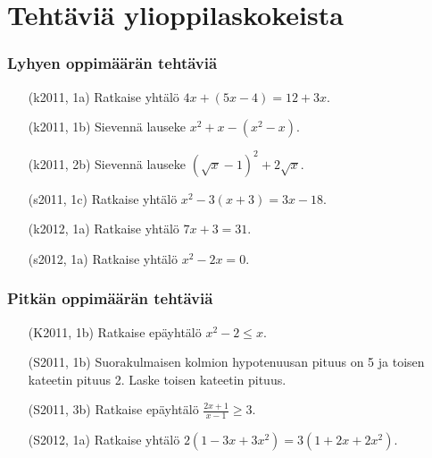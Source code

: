\chapter{Tehtäviä ylioppilaskokeista}

\subsection*{Lyhyen oppimäärän tehtäviä}

\begin{itemize}
  \item[(k2011, 1a)] Ratkaise yhtälö $4x+(5x-4) = 12+3x$.
  \item[(k2011, 1b)] Sievennä lauseke $x^2+x-(x^2-x)$.
  \item[(k2011, 2b)] Sievennä lauseke $(\sqrt{x}-1)^2+2\sqrt{x}$.
  \item[(s2011, 1c)] Ratkaise yhtälö $x^2-3(x+3) = 3x-18$.
  \item[(k2012, 1a)] Ratkaise yhtälö $7x+3 = 31$.
  \item[(s2012, 1a)] Ratkaise yhtälö $x^2-2x = 0$.
\end{itemize}

\subsection*{Pitkän oppimäärän tehtäviä}

\begin{itemize}
  \item[(K2011, 1b)] Ratkaise epäyhtälö $x^2-2 \leq x$.
  \item[(S2011, 1b)] Suorakulmaisen kolmion hypotenuusan pituus on 5
   ja toisen kateetin pituus 2. Laske toisen kateetin pituus.
  \item[(S2011, 3b)] Ratkaise epäyhtälö $\frac{2x+1}{x-1} \geq 3$.
  \item[(S2012, 1a)] Ratkaise yhtälö $2(1-3x+3x^2) = 3(1+2x+2x^2)$.
\end{itemize}




